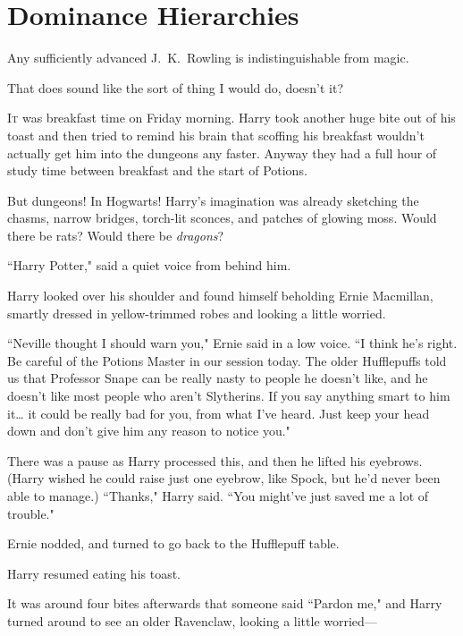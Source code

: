 \chapter{Dominance Hierarchies}

\begin{chapterOpeningAuthorNote}
Any sufficiently advanced J.~K.~Rowling is indistinguishable from magic.
\end{chapterOpeningAuthorNote}
\begin{chapterOpeningQuote}
That does sound like the sort of thing I would do, doesn't it?
\end{chapterOpeningQuote}

\lettrine{I}{t} was breakfast time on Friday morning. Harry took another huge bite out of his toast and then tried to remind his brain that scoffing his breakfast wouldn't actually get him into the dungeons any faster. Anyway they had a full hour of study time between breakfast and the start of Potions.

But dungeons! In Hogwarts! Harry's imagination was already sketching the chasms, narrow bridges, torch-lit sconces, and patches of glowing moss. Would there be rats? Would there be \emph{dragons}?

``Harry Potter," said a quiet voice from behind him.

Harry looked over his shoulder and found himself beholding Ernie Macmillan, smartly dressed in yellow-trimmed robes and looking a little worried.

``Neville thought I should warn you," Ernie said in a low voice. ``I think he's right. Be careful of the Potions Master in our session today. The older Hufflepuffs told us that Professor Snape can be really nasty to people he doesn't like, and he doesn't like most people who aren't Slytherins. If you say anything smart to him it{\ldots} it could be really bad for you, from what I've heard. Just keep your head down and don't give him any reason to notice you."

There was a pause as Harry processed this, and then he lifted his eyebrows. (Harry wished he could raise just one eyebrow, like Spock, but he'd never been able to manage.) ``Thanks," Harry said. ``You might've just saved me a lot of trouble."

Ernie nodded, and turned to go back to the Hufflepuff table.

Harry resumed eating his toast.

It was around four bites afterwards that someone said ``Pardon me," and Harry turned around to see an older Ravenclaw, looking a little worried—

